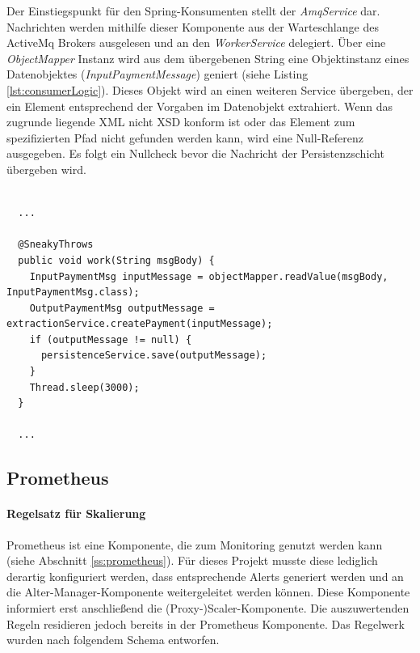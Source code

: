 Der Einstiegspunkt für den Spring-Konsumenten stellt der \emph{AmqService} dar. Nachrichten werden mithilfe dieser Komponente aus der Warteschlange des ActiveMq Brokers ausgelesen und an den \emph{WorkerService} delegiert. Über eine \emph{ObjectMapper} Instanz wird aus dem übergebenen String eine Objektinstanz eines Datenobjektes (\emph{InputPaymentMessage}) geniert (siehe Listing \ref{lst:consumerLogic}). Dieses Objekt wird an einen weiteren Service übergeben, der ein Element entsprechend der Vorgaben im Datenobjekt extrahiert. Wenn das zugrunde liegende XML nicht XSD konform ist oder das Element zum spezifizierten Pfad nicht gefunden werden kann, wird eine Null-Referenz ausgegeben. Es folgt ein Nullcheck bevor die Nachricht der Persistenzschicht übergeben wird.

\begin{minipage}{\linewidth}
\begin{lstlisting}[style=javaStyle,caption={WorkerService - Konsumer Logik},label=lst:consumerLogic]

  ...

  @SneakyThrows
  public void work(String msgBody) {
    InputPaymentMsg inputMessage = objectMapper.readValue(msgBody, InputPaymentMsg.class);
    OutputPaymentMsg outputMessage = extractionService.createPayment(inputMessage);
    if (outputMessage != null) {
      persistenceService.save(outputMessage);
    }
    Thread.sleep(3000);
  }

  ...

\end{lstlisting}
\end{minipage}

\subsection{Prometheus \checkmark}

\paragraph{Regelsatz für Skalierung}
Prometheus ist eine Komponente, die zum Monitoring genutzt werden kann (siehe Abschnitt \ref{ss:prometheus}). Für dieses Projekt musste diese lediglich derartig konfiguriert werden, dass entsprechende Alerts generiert werden und an die Alter-Manager-Komponente weitergeleitet werden können. Diese Komponente informiert erst anschließend die (Proxy-)Scaler-Komponente. Die auszuwertenden Regeln residieren jedoch bereits in der Prometheus Komponente. Das Regelwerk wurden nach folgendem Schema entworfen.

